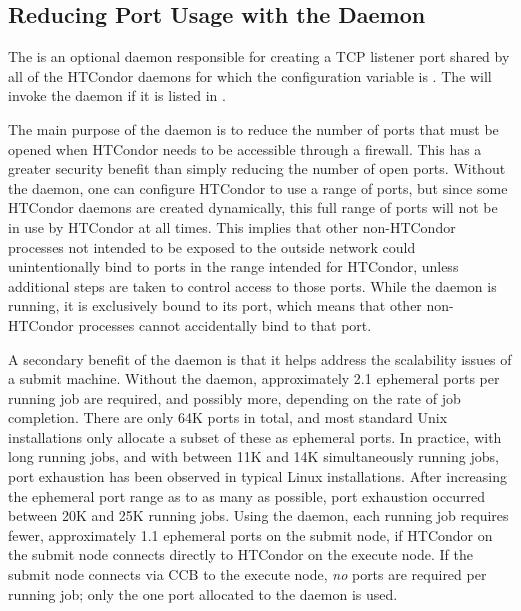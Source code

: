 \subsection{\label{sec:shared-port-daemon}Reducing Port Usage with the  Daemon}

The  is an optional daemon
responsible for creating a TCP listener port shared by all of the
HTCondor daemons for which the configuration variable
 is .
The  will invoke the  daemon
if it is listed in .

The main purpose of the  daemon is to reduce the
number of ports that must be opened when HTCondor needs to be
accessible through a firewall.
This has a greater security benefit
than simply reducing the number of open ports.
Without the  daemon,
one can configure HTCondor to use a range of ports,
but since some HTCondor daemons are created dynamically, 
this full range of ports will not be in use by HTCondor at all times.
This implies that other non-HTCondor processes not intended to be exposed to
the outside network could unintentionally bind to ports in the range
intended for HTCondor,
unless additional steps are taken to control access to those ports.  
While the  daemon is running,
it is exclusively bound to its port, which means that other non-HTCondor
processes cannot accidentally bind to that port.

A secondary benefit of the  daemon
is that it helps address the scalability issues of a submit machine.
Without the  daemon,
approximately 2.1 ephemeral ports per running job are required,
and possibly more, depending on the rate of job completion.
There are only 64K ports in total,
and most standard Unix installations only allocate a subset of
these as ephemeral ports.
In practice, with long running jobs,
and with between 11K and 14K simultaneously running jobs,
port exhaustion has been observed in typical Linux installations.
After increasing the ephemeral port range as to as many as possible,
port exhaustion occurred between 20K and 25K running jobs.
Using the  daemon,
each running job requires fewer, approximately 1.1 ephemeral ports
on the submit node, if HTCondor on the submit node connects directly
to HTCondor on the execute node.
If the submit node connects via CCB to the execute
node, \emph{no} ports are required per running job; only the one port
allocated to the  daemon is used.

